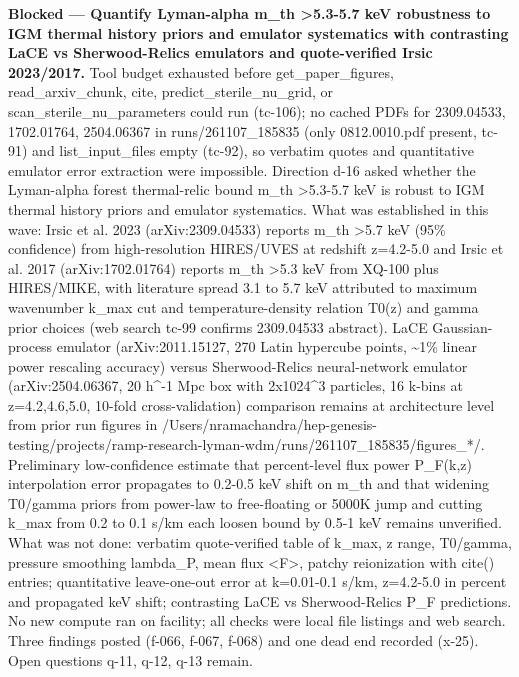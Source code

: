 \documentclass[11pt,a4paper]{article}
\begin{document}
\textbf{Blocked --- Quantify Lyman-alpha m\_th \textgreater{}5.3-5.7 keV robustness to IGM thermal history priors and emulator systematics with contrasting LaCE vs Sherwood-Relics emulators and quote-verified Irsic 2023/2017.} Tool budget exhausted before get\_paper\_figures, read\_arxiv\_chunk, cite, predict\_sterile\_nu\_grid, or scan\_sterile\_nu\_parameters could run (tc-106); no cached PDFs for 2309.04533, 1702.01764, 2504.06367 in runs/261107\_185835 (only 0812.0010.pdf present, tc-91) and list\_input\_files empty (tc-92), so verbatim quotes and quantitative emulator error extraction were impossible. Direction d-16 asked whether the Lyman-alpha forest thermal-relic bound m\_th \textgreater{}5.3-5.7 keV is robust to IGM thermal history priors and emulator systematics. What was established in this wave: Irsic et al. 2023 (arXiv:2309.04533) reports m\_th \textgreater{}5.7 keV (95\% confidence) from high-resolution HIRES/UVES at redshift z=4.2-5.0 and Irsic et al. 2017 (arXiv:1702.01764) reports m\_th \textgreater{}5.3 keV from XQ-100 plus HIRES/MIKE, with literature spread 3.1 to 5.7 keV attributed to maximum wavenumber k\_max cut and temperature-density relation T0(z) and gamma prior choices (web search tc-99 confirms 2309.04533 abstract). LaCE Gaussian-process emulator (arXiv:2011.15127, 270 Latin hypercube points, \textasciitilde{}1\% linear power rescaling accuracy) versus Sherwood-Relics neural-network emulator (arXiv:2504.06367, 20 h\textasciicircum{}-1 Mpc box with 2x1024\textasciicircum{}3 particles, 16 k-bins at z=4.2,4.6,5.0, 10-fold cross-validation) comparison remains at architecture level from prior run figures in /Users/nramachandra/hep-genesis-testing/projects/ramp-research-lyman-wdm/runs/261107\_185835/figures\_*/. Preliminary low-confidence estimate that percent-level flux power P\_F(k,z) interpolation error propagates to 0.2-0.5 keV shift on m\_th and that widening T0/gamma priors from power-law to free-floating or 5000K jump and cutting k\_max from 0.2 to 0.1 s/km each loosen bound by 0.5-1 keV remains unverified. What was not done: verbatim quote-verified table of k\_max, z range, T0/gamma, pressure smoothing lambda\_P, mean flux \textless{}F\textgreater{}, patchy reionization with cite() entries; quantitative leave-one-out error at k=0.01-0.1 s/km, z=4.2-5.0 in percent and propagated keV shift; contrasting LaCE vs Sherwood-Relics P\_F predictions. No new compute ran on facility; all checks were local file listings and web search. Three findings posted (f-066, f-067, f-068) and one dead end recorded (x-25). Open questions q-11, q-12, q-13 remain.
\end{document}
